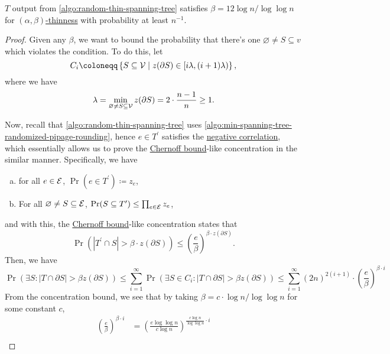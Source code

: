 \begin{lemma}\label{lma:lec12-2}
	\(T\) output from \autoref{algo:random-thin-spanning-tree} satisfies \(\beta = 12\log n / \log \log n\) for \hyperref[def:thin]{\((\alpha , \beta )\)-thinness} with probability at least \(n^{-1} \).
\end{lemma}
\begin{proof}
	Given any \(\beta \), we want to bound the probability that there's one \(\varnothing \neq S \subseteq v\) which violates the condition. To do this, let
	\[
		C_i \coloneqq \left\{ S \subseteq \mathcal{\MakeUppercase{v}} \mid z(\partial S) \in [i \lambda , (i+1)\lambda ) \right\} ,
	\]
	where we have
	\[
		\lambda = \min _{\varnothing \neq S \subseteq \mathcal{\MakeUppercase{v}} }z(\partial S) = 2\cdot \frac{n-1}{n} \geq 1.
	\]

	Now, recall that \autoref{algo:random-thin-spanning-tree} uses \autoref{algo:min-spanning-tree-randomized-pipage-rounding}, hence \(e\in T^\prime \) satisfies the \hyperref[thm:negative-correlation]{negative correlation}, which essentially allows us to prove the \href{https://en.wikipedia.org/wiki/Chernoff_bound}{Chernoff bound}-like concentration in the similar manner. Specifically, we have
	\begin{enumerate}[(a)]
		\item for all \(e\in \mathcal{\MakeUppercase{e}} \), \(\Pr(e\in T^\prime ) \coloneqq z_e\),
		\item For all \(\varnothing \neq S \subseteq \mathcal{\MakeUppercase{e}} \), \(\Pr(S \subseteq T^\prime) \leq \prod_{e\in \mathcal{\MakeUppercase{e}} } z_e\),
	\end{enumerate}
	and with this, the \href{https://en.wikipedia.org/wiki/Chernoff_bound}{Chernoff bound}-like concentration states that
	\[
		\Pr(\left\vert T^\prime \cap S \right\vert > \beta \cdot z(\partial S)) \leq \left( \frac{e}{\beta } \right) ^{\beta \cdot z(\partial S)}.
	\]
	Then, we have
	\[
		\Pr(\exists S\colon \left\vert T \cap \partial S \right\vert > \beta z(\partial S))
		\leq \sum_{i=1} ^{\infty} \Pr(\exists S\in C_i \colon \left\vert T \cap \partial S \right\vert > \beta z(\partial S))
		\leq \sum_{i=1}^{\infty} (2n)^{2(i+1)} \cdot \left( \frac{e}{\beta } \right) ^{\beta \cdot i}
	\]
	From the concentration bound, we see that by taking \(\beta = c\cdot \log n / \log \log n\) for some constant \(c\),
	\[
		\begin{split}
			\left( \frac{e}{\beta } \right) ^{\beta \cdot i}
			&= \left( \frac{e \log \log n}{c \log n} \right) ^{\frac{c\log n}{\log \log n}\cdot i}\\

\end{split}\]
\end{proof}
